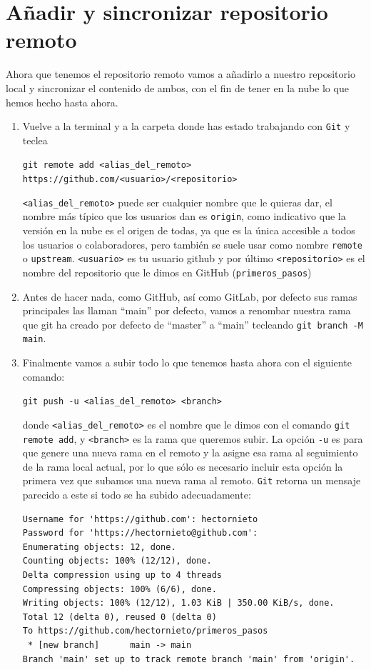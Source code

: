 \documentclass[a4paper,11pt]{report}
\newcommand{\cverb}{\Verb}
\begin{document}
    \section{Añadir y sincronizar repositorio remoto}\label{sec:sincronizar}
      Ahora que tenemos el repositorio remoto vamos a añadirlo a nuestro repositorio local y sincronizar el contenido de ambos, con el fin de tener en la nube lo que hemos hecho hasta ahora. 
      \begin{enumerate}
       \item Vuelve a la terminal y a la carpeta donde has estado trabajando con \verb+Git+ y teclea

        \hspace{-3cm}\cverb+git remote add <alias_del_remoto> https://github.com/<usuario>/<repositorio>+
       
       \cverb+<alias_del_remoto>+ puede ser cualquier nombre que le quieras dar, el nombre más típico que los usuarios dan es \cverb+origin+, como indicativo que la versión en la nube es el origen de todas, ya que es la única accesible a todos los usuarios o colaboradores, pero también se suele usar como nombre \cverb+remote+ o \cverb+upstream+. \cverb+<usuario>+ es tu usuario github y por último \cverb+<repositorio>+ es el nombre del repositorio que le dimos en GitHub (\cverb+primeros_pasos+)

       \item Antes de hacer nada, como GitHub, así como GitLab, por defecto sus ramas principales las llaman ``main'' por defecto, vamos a renombar nuestra rama que git ha creado por defecto de ``master'' a ``main'' tecleando \cverb+git branch -M main+.

       \item Finalmente vamos a subir todo lo que tenemos hasta ahora con el siguiente comando:
       
       \cverb+git push -u <alias_del_remoto> <branch>+
       
       donde \cverb+<alias_del_remoto>+ es el nombre que le dimos con el comando \cverb+git remote add+, y \cverb+<branch>+ es la rama que queremos subir. La opción \cverb+-u+ es para que genere una nueva rama en el remoto y la asigne esa rama al seguimiento de la rama local actual, por lo que sólo es necesario incluir esta opción la primera vez que subamos una nueva rama al remoto. \verb+Git+ retorna un mensaje parecido a este si todo se ha subido adecuadamente:
       \begin{lstlisting}[style=custom]
Username for 'https://github.com': hectornieto
Password for 'https://hectornieto@github.com': 
Enumerating objects: 12, done.
Counting objects: 100% (12/12), done.
Delta compression using up to 4 threads
Compressing objects: 100% (6/6), done.
Writing objects: 100% (12/12), 1.03 KiB | 350.00 KiB/s, done.
Total 12 (delta 0), reused 0 (delta 0)
To https://github.com/hectornieto/primeros_pasos
 * [new branch]      main -> main
Branch 'main' set up to track remote branch 'main' from 'origin'.
      \end{lstlisting}
      

\end{enumerate}
\end{document}
